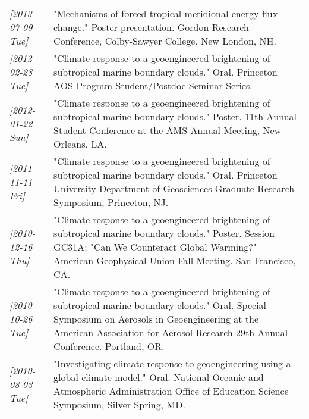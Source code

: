 \documentclass{article}
\begin{document}
\begin{center}
\begin{tabularx}{\textwidth}{lX}
\textit{[2013-07-09 Tue]} & "Mechanisms of forced tropical meridional energy flux change."  Poster presentation.  Gordon Research Conference, Colby-Sawyer College, New London, NH.\\
\textit{[2012-02-28 Tue]} & "Climate response to a geoengineered brightening of subtropical marine boundary clouds."  Oral.  Princeton AOS Program Student/Postdoc Seminar Series.\\
\textit{[2012-01-22 Sun]} & "Climate response to a geoengineered brightening of subtropical marine boundary clouds."  Poster.  11th Annual Student Conference at the AMS Annual Meeting, New Orleans, LA.\\
\textit{[2011-11-11 Fri]} & "Climate response to a geoengineered brightening of subtropical marine boundary clouds."  Oral.  Princeton University Department of Geosciences Graduate Research Symposium, Princeton, NJ.\\
\textit{[2010-12-16 Thu]} & "Climate response to a geoengineered brightening of subtropical marine boundary clouds."  Poster.  Session GC31A: "Can We Counteract Global Warming?" American Geophysical Union Fall Meeting.  San Francisco, CA.\\
\textit{[2010-10-26 Tue]} & "Climate response to a geoengineered brightening of subtropical marine boundary clouds."  Oral.  Special Symposium on Aerosols in Geoengineering at the American Association for Aerosol Research 29th Annual Conference.  Portland, OR.\\
\textit{[2010-08-03 Tue]} & "Investigating climate response to geoengineering using a global climate model."  Oral.  National Oceanic and Atmospheric Administration Office of Education Science Symposium, Silver Spring, MD.\\
\end{tabularx}
\end{center}
\end{document}
